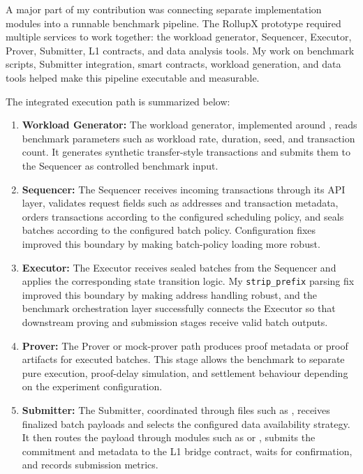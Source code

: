 A major part of my contribution was connecting separate implementation modules into a runnable benchmark pipeline. The RollupX prototype required multiple services to work together: the workload generator, Sequencer, Executor, Prover, Submitter, L1 contracts, and data analysis tools. My work on benchmark scripts, Submitter integration, smart contracts, workload generation, and data tools helped make this pipeline executable and measurable.

The integrated execution path is summarized below:

\begin{enumerate}
    \item \textbf{Workload Generator:} The workload generator, implemented around , reads benchmark parameters such as workload rate, duration, seed, and transaction count. It generates synthetic transfer-style transactions and submits them to the Sequencer as controlled benchmark input.

    \item \textbf{Sequencer:} The Sequencer receives incoming transactions through its API layer, validates request fields such as addresses and transaction metadata, orders transactions according to the configured scheduling policy, and seals batches according to the configured batch policy. Configuration fixes improved this boundary by making batch-policy loading more robust.

    \item \textbf{Executor:} The Executor receives sealed batches from the Sequencer and applies the corresponding state transition logic. My \texttt{strip\_prefix} parsing fix improved this boundary by making address handling robust, and the benchmark orchestration layer successfully connects the Executor so that downstream proving and submission stages receive valid batch outputs.

    \item \textbf{Prover:} The Prover or mock-prover path produces proof metadata or proof artifacts for executed batches. This stage allows the benchmark to separate pure execution, proof-delay simulation, and settlement behaviour depending on the experiment configuration.

    \item \textbf{Submitter:} The Submitter, coordinated through files such as , receives finalized batch payloads and selects the configured data availability strategy. It then routes the payload through modules such as  or , submits the commitment and metadata to the L1 bridge contract, waits for confirmation, and records submission metrics.


\end{enumerate}
